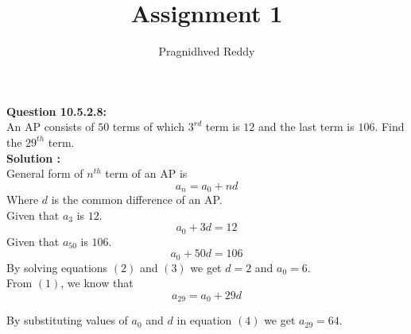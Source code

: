 \documentclass[12pt]{article}
\title{Assignment 1}
\author{Pragnidhved Reddy}
\begin{document}
\maketitle
\textbf{Question 10.5.2.8:}\\
An AP consists of $50$ terms of which $3^{rd}$ term is $12$ and the last term is $106$. Find the $29^{th}$ term.\\
\textbf{Solution :}\\
General form of $n^{th}$ term of an AP is\\
\begin{equation}
a_n=a_0+nd
\end{equation}
Where $d$ is the common difference of an AP.\\
Given that $a_3$ is $12$.\\
\begin{equation}
 a_0+3d=12
 \end{equation}
 Given that $a_{50}$ is $106$.\\
 \begin{equation}
a_0+50d=106
 \end{equation}
 By solving equations $(2)$ and $(3)$ we get $d=2$ and $a_0=6.$\\
 From $(1)$, we know that
 \begin{equation}
 a_{29}=a_0+29d
 \end{equation}
 
 By substituting values of $a_0$ and $d$ in equation $(4)$ we get $a_{29}=64$.\\\\\\\\\\\\\\
 
\end{document}
